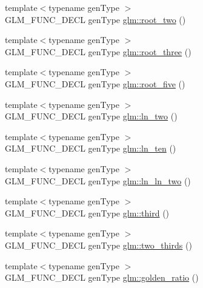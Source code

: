 \begin{DoxyCompactItemize}
\item 
{\footnotesize template$<$typename gen\+Type $>$ }\\G\+L\+M\+\_\+\+F\+U\+N\+C\+\_\+\+D\+E\+C\+L gen\+Type \hyperlink{group__gtc__constants_gab91b7799f88f9f2be33e385dec11b9c2}{glm\+::root\+\_\+two} ()
\item 
{\footnotesize template$<$typename gen\+Type $>$ }\\G\+L\+M\+\_\+\+F\+U\+N\+C\+\_\+\+D\+E\+C\+L gen\+Type \hyperlink{group__gtc__constants_gab3183635ac615473e2f95852f491be83}{glm\+::root\+\_\+three} ()
\item 
{\footnotesize template$<$typename gen\+Type $>$ }\\G\+L\+M\+\_\+\+F\+U\+N\+C\+\_\+\+D\+E\+C\+L gen\+Type \hyperlink{group__gtc__constants_gace2b8dfed1ab9fabbb67dde08e7e5b58}{glm\+::root\+\_\+five} ()
\item 
{\footnotesize template$<$typename gen\+Type $>$ }\\G\+L\+M\+\_\+\+F\+U\+N\+C\+\_\+\+D\+E\+C\+L gen\+Type \hyperlink{group__gtc__constants_ga22fae798430edc3022766af4fd83e8a4}{glm\+::ln\+\_\+two} ()
\item 
{\footnotesize template$<$typename gen\+Type $>$ }\\G\+L\+M\+\_\+\+F\+U\+N\+C\+\_\+\+D\+E\+C\+L gen\+Type \hyperlink{group__gtc__constants_ga48addf0cb0980277d208a71a1c59c073}{glm\+::ln\+\_\+ten} ()
\item 
{\footnotesize template$<$typename gen\+Type $>$ }\\G\+L\+M\+\_\+\+F\+U\+N\+C\+\_\+\+D\+E\+C\+L gen\+Type \hyperlink{group__gtc__constants_ga650774609debe4a90bcac449b574de2c}{glm\+::ln\+\_\+ln\+\_\+two} ()
\item 
{\footnotesize template$<$typename gen\+Type $>$ }\\G\+L\+M\+\_\+\+F\+U\+N\+C\+\_\+\+D\+E\+C\+L gen\+Type \hyperlink{group__gtc__constants_gabf280496105e0ad070287417f840ebd8}{glm\+::third} ()
\item 
{\footnotesize template$<$typename gen\+Type $>$ }\\G\+L\+M\+\_\+\+F\+U\+N\+C\+\_\+\+D\+E\+C\+L gen\+Type \hyperlink{group__gtc__constants_gadde7f2efce3b14c8b26944fbafed4a10}{glm\+::two\+\_\+thirds} ()
\item 
{\footnotesize template$<$typename gen\+Type $>$ }\\G\+L\+M\+\_\+\+F\+U\+N\+C\+\_\+\+D\+E\+C\+L gen\+Type \hyperlink{group__gtc__constants_gafd53093ef2d756333865d774bea3cdf9}{glm\+::golden\+\_\+ratio} ()
\end{DoxyCompactItemize}


